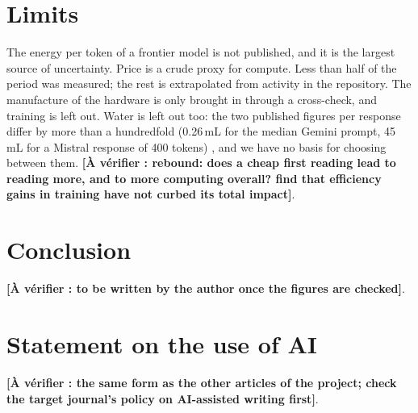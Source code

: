 \documentclass[11pt,a4paper]{article}
\newcommand{\todo}[1]{\textbf{[À vérifier : #1]}}
\begin{document}
\section{Limits}

The energy per token of a frontier model is not published, and it is the largest source of uncertainty. Price is a crude proxy for compute. Less than half of the period was measured; the rest is extrapolated from activity in the repository. The manufacture of the hardware is only brought in through a cross-check, and training is left out. Water is left out too: the two published figures per response differ by more than a hundredfold (0.26\,mL for the median Gemini prompt, 45\,mL for a Mistral response of 400 tokens) \citep{elsworth2025,mistral2025}, and we have no basis for choosing between them. \todo{rebound: does a cheap first reading lead to reading more, and to more computing overall? \citet{morand2026} find that efficiency gains in training have not curbed its total impact}.

\section{Conclusion}

\todo{to be written by the author once the figures are checked}.

\section*{Statement on the use of AI}
\todo{the same form as the other articles of the project; check the target journal's policy on AI-assisted writing first}.

\renewcommand{\bibfont}{\small\raggedright}


\end{document}
